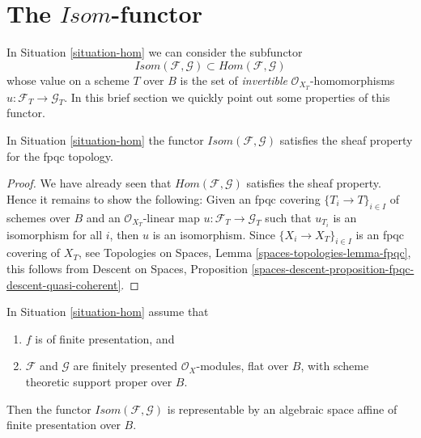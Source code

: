 \section{The $\mathit{Isom}$-functor}
\label{section-isom}

\noindent
In Situation \ref{situation-hom} we can consider the subfunctor
$$
\mathit{Isom}(\mathcal{F}, \mathcal{G}) \subset
\mathit{Hom}(\mathcal{F}, \mathcal{G})
$$
whose value on a scheme $T$ over $B$ is the set of {\it invertible}
$\mathcal{O}_{X_T}$-homomorphisms $u : \mathcal{F}_T \to \mathcal{G}_T$.
In this brief section we quickly point out some properties of this
functor.

\begin{lemma}
\label{lemma-isom-sheaf}
In Situation \ref{situation-hom} the functor
$\mathit{Isom}(\mathcal{F}, \mathcal{G})$ 
satisfies the sheaf property for the fpqc topology.
\end{lemma}

\begin{proof}
We have already seen that $\mathit{Hom}(\mathcal{F}, \mathcal{G})$
satisfies the sheaf property. Hence it remains to show the following:
Given an fpqc covering $\{T_i \to T\}_{i \in I}$ of schemes over $B$
and an $\mathcal{O}_{X_T}$-linear map
$u : \mathcal{F}_T \to \mathcal{G}_T$ such that
$u_{T_i}$ is an isomorphism for all $i$, then $u$ is an isomorphism.
Since $\{X_i \to X_T\}_{i \in I}$ is an fpqc covering of $X_T$, see
Topologies on Spaces, Lemma \ref{spaces-topologies-lemma-fpqc},
this follows from
Descent on Spaces, Proposition
\ref{spaces-descent-proposition-fpqc-descent-quasi-coherent}.
\end{proof}

\begin{proposition}
\label{proposition-isom}
In Situation \ref{situation-hom} assume that
\begin{enumerate}
\item $f$ is of finite presentation, and
\item $\mathcal{F}$ and $\mathcal{G}$ are finitely presented
$\mathcal{O}_X$-modules, flat over $B$, with scheme theoretic
support proper over $B$.
\end{enumerate}
Then the functor $\mathit{Isom}(\mathcal{F}, \mathcal{G})$ is
representable by an algebraic space affine of finite presentation
over $B$.
\end{proposition}

